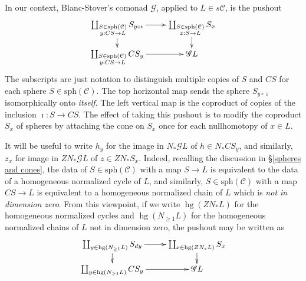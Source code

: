 \documentclass[11pt]{amsart} \renewcommand{\baselinestretch}{1.4}
\theoremstyle{plain}
\theoremstyle{definition}
\DeclareMathOperator{\homog}{hg}
\renewcommand{\to}{\longrightarrow}
\newcommand{\scrG}{\mathscr{G}}
\newcommand{\calc}{\mathcal{C}}
\newcommand{\spheres}[1]{\mathrm{sph}(#1)}
\newcommand{\BSW}{{\scrG}}
\begin{document}
\begin{Composite functor spectral sequences}
In our context, Blanc-Stover's comonad $\BSW$, applied to $L\in s\calc$, is the pushout
\[\xymatrix@R=4mm{
\coprod_{\substack{S\in\spheres{\calc}\\y:CS\rightarrow L}}S_{ y\circ\imath}
\ar[r]\ar[d]%
&%
\coprod_{\substack{S\in\spheres{\calc}\\x:S\rightarrow L}}S_{ x}\ar[d]\\%
\coprod_{\substack{S\in\spheres{\calc}\\y:CS\rightarrow L}}CS_{ y}
\ar[r]&%
\BSW L%
}\]
The subscripts are just notation to distinguish multiple copies of $S$ and $CS$ for each sphere $S\in\spheres{\calc}$.
The top horizontal map sends the sphere $S_{ y\circ\imath}$ isomorphically onto \emph{itself}. The left vertical map is the coproduct of copies of the inclusion $\imath:S\to CS$. The effect of taking this pushout is to modify the coproduct $S_{ x}$ of spheres by attaching the  cone on $S_{ x}$  once for each nullhomotopy of $x\in L$.

It will be useful to write $h_y$ for the image in $N_*\BSW L$ of $h\in N_*CS_{ y}$, and similarly, $z_x$ for image in $ZN_*\BSW L$ of $z\in ZN_*S_{ x}$. Indeed, recalling the discussion in \S\ref{spheres and cones}, the data of $S\in\spheres{\calc}$ with a map $S\to L$ is equivalent to the data of a homogeneous normalized cycle of $L$, and similarly, $S\in\spheres{\calc}$ with a map $CS\to L$ is equivalent to a homogeneous normalized chain of $L$ which is \emph{not in dimension zero}. From this viewpoint, if we write $\homog (ZN_*L)$ for the homogeneous normalized cycles and $\homog (N_{\geq1}L)$ for the homogeneous normalized chains of $L$ not in dimension zero, the pushout may be written as
\[\xymatrix@R=4mm{
\coprod_{y\in \homog (N_{\geq1}L)}S_{ dy}
\ar[r]\ar[d]%
&%
\coprod_{x\in \homog (ZN_*L)}S_{ x}\ar[d]\\%
\coprod_{y\in \homog (N_{\geq1}L)}CS_{ y}
\ar[r]&%
\BSW L%
}\]




\end{Composite functor spectral sequences}
\end{document}
